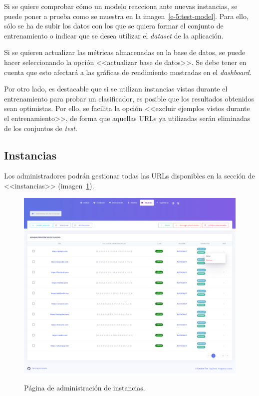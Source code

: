 Si se quiere comprobar cómo un modelo reacciona ante nuevas instancias, se puede poner a prueba como se muestra en la imagen~\ref{e-5:test-model}. Para ello, sólo se ha de subir los datos con los que se quiera formar el conjunto de entrenamiento o indicar que se desea utilizar el \textit{dataset} de la aplicación.

Si se quieren actualizar las métricas almacenadas en la base de datos, se puede hacer seleccionando la opción <<actualizar base de datos>>. Se debe tener en cuenta que esto afectará a las gráficas de rendimiento mostradas en el \textit{dashboard}.

Por otro lado, es destacable que si se utilizan instancias vistas durante el entrenamiento para probar un clasificador, es posible que los resultados obtenidos sean optimistas. Por ello, se facilita la opción <<excluir ejemplos vistos durante el entrenamiento>>, de forma que aquellas URLs ya utilizadas serán eliminadas de los conjuntos de \textit{test}.

\subsection{Instancias}
\label{s-e:instances}

Los administradores podrán gestionar todas las URLs disponibles en la sección de <<instancias>> (imagen~\ref{e-5:instances}).

\begin{figure}[h]
	\caption[Manual de usuario: página de instancias]{Página de administración de instancias.}
	\centering
	\includegraphics[width=\textwidth]{../img/anexos/user_guide/6_instances}
	\label{e-5:instances}
\end{figure}

